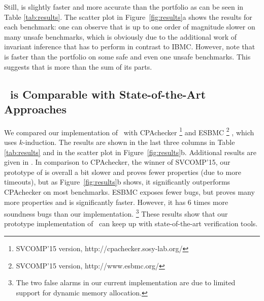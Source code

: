 {Still, {\algorithmName} is slightly faster and more
accurate than the portfolio as can be seen in Table \ref{tab:results}.
%
The scatter plot in Figure~\ref{fig:results}a shows the results for
each benchmark:
%
one can observe that {\algorithmName} is up to one order of magnitude
slower on many unsafe benchmarks, which is obviously due to the
additional work of invariant inference that
{\algorithmName} has to perform in contrast to IBMC.
%
However, note that {\algorithmName} is faster than the 
portfolio on some safe and even one unsafe benchmarks.
This suggests that {\algorithmName} is more than the sum of its parts.

\subsection{\algorithmName\ is Comparable with State-of-the-Art Approaches}

We compared our implementation of \algorithmName\ with
CPAchecker%
\footnote{SVCOMP'15 version, http://cpachecker.sosy-lab.org/}%
%
and ESBMC%
\footnote{SVCOMP'15 version, http://www.esbmc.org/}%
, which uses $k$-induction.
%
The results are shown in the last three columns in Table \ref{tab:results}
and in the scatter plot in Figure~\ref{fig:results}b. Additional
results are given in .
%
In comparison to CPAchecker, the winner of SVCOMP'15,
our prototype of {\algorithmName} is overall a bit slower and proves 
fewer properties (due to more timeouts), but as
Figure~\ref{fig:results}b shows, it significantly outperforms
CPAchecker on most benchmarks.
%
ESBMC exposes fewer bugs, but proves many more properties and is 
significantly faster. However, it has 6 times
more soundness bugs than our implementation.%
\footnote{The two false alarms in our current implementation are due to 
limited support for dynamic memory allocation.}
%
These results show that our prototype implementation of
\algorithmName\ can keep up with state-of-the-art verification tools.

}
